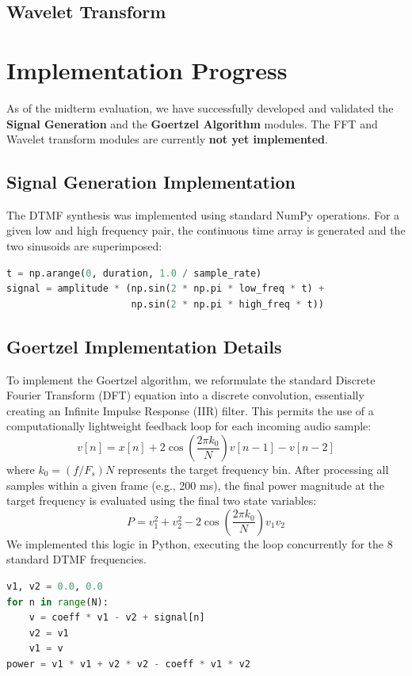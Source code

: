 \documentclass[12pt, a4paper]{article}
\begin{document}
\subsection{Wavelet Transform}

\section{Implementation Progress}
As of the midterm evaluation, we have successfully developed and validated the \textbf{Signal Generation} and the \textbf{Goertzel Algorithm} modules. The FFT and Wavelet transform modules are currently \textbf{not yet implemented}.

\subsection{Signal Generation Implementation}
The DTMF synthesis was implemented using standard NumPy operations. For a given low and high frequency pair, the continuous time array is generated and the two sinusoids are superimposed:
\begin{lstlisting}[language=Python, basicstyle=\ttfamily\small, frame=single, xleftmargin=1em]
t = np.arange(0, duration, 1.0 / sample_rate)
signal = amplitude * (np.sin(2 * np.pi * low_freq * t) +
                      np.sin(2 * np.pi * high_freq * t))
\end{lstlisting}

\subsection{Goertzel Implementation Details}
To implement the Goertzel algorithm, we reformulate the standard Discrete Fourier Transform (DFT) equation into a discrete convolution, essentially creating an Infinite Impulse Response (IIR) filter. This permits the use of a computationally lightweight feedback loop for each incoming audio sample:
\begin{equation}
    v[n] = x[n] + 2\cos\left(\frac{2\pi k_0}{N}\right)v[n-1] - v[n-2]
\end{equation}
where $k_0 = (f / F_s) N$ represents the target frequency bin. After processing all samples within a given frame (e.g., 200 ms), the final power magnitude at the target frequency is evaluated using the final two state variables:
\begin{equation}
    P = v_1^2 + v_2^2 - 2\cos\left(\frac{2\pi k_0}{N}\right) v_1 v_2
\end{equation}
We implemented this logic in Python, executing the loop concurrently for the 8 standard DTMF frequencies.
\begin{lstlisting}[language=Python, basicstyle=\ttfamily\small, frame=single, xleftmargin=1em]
v1, v2 = 0.0, 0.0
for n in range(N):
    v = coeff * v1 - v2 + signal[n]
    v2 = v1
    v1 = v
power = v1 * v1 + v2 * v2 - coeff * v1 * v2
\end{lstlisting}
\end{document}

